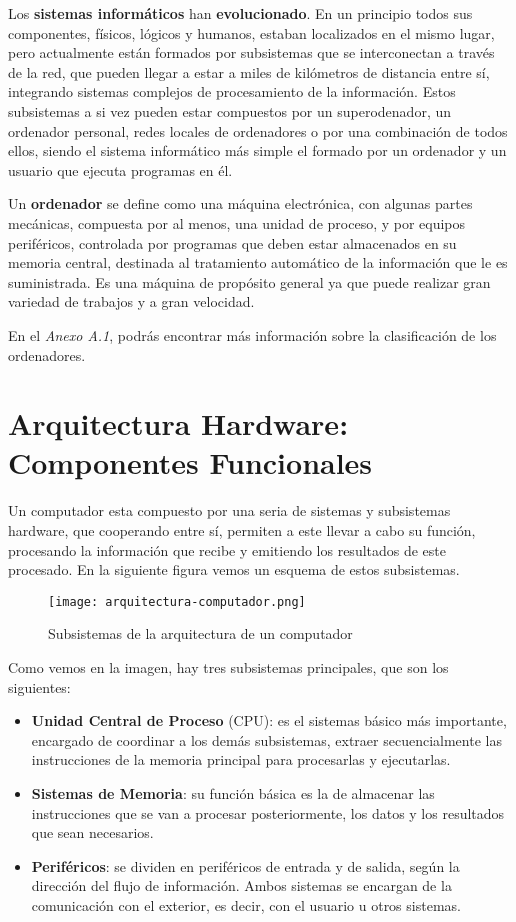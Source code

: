 Los \textbf{sistemas informáticos} han \textbf{evolucionado}. En un principio todos sus componentes, físicos, lógicos y humanos, estaban localizados en el mismo lugar, pero actualmente están formados por subsistemas que se interconectan a través de la red, que pueden llegar a estar a miles de kilómetros de distancia entre sí, integrando sistemas complejos de procesamiento de la información. Estos subsistemas a si vez pueden estar compuestos por un superodenador, un ordenador personal, redes locales de ordenadores o por una combinación de todos ellos, siendo el sistema informático más simple el formado por un ordenador y un usuario que ejecuta programas en él.

Un \textbf{ordenador} se define como una máquina electrónica, con algunas partes mecánicas, compuesta por al menos, una unidad de proceso, y por equipos periféricos, controlada por programas que deben estar almacenados en su memoria central, destinada al tratamiento automático de la información que le es suministrada. Es una máquina de propósito general ya que puede realizar gran variedad de trabajos y a gran velocidad.

En el \textit{Anexo A.1}, podrás encontrar más información sobre la clasificación de los ordenadores.

\section{Arquitectura Hardware: Componentes Funcionales}
Un computador esta compuesto por una seria de sistemas y subsistemas hardware, que cooperando entre sí, permiten a este llevar a cabo su función, procesando la información que recibe y emitiendo los resultados de este procesado.  En la siguiente figura vemos un esquema de estos subsistemas.

\begin{figure}[ht]
    \centering
    \texttt{[image: arquitectura-computador.png]}
    \caption{Subsistemas de la arquitectura de un computador}
\end{figure}


Como vemos en la imagen, hay tres subsistemas principales, que son los siguientes:

\begin{itemize}
    \item \textbf{Unidad Central de Proceso} (CPU): es el sistemas básico más importante, encargado de coordinar a los demás subsistemas, extraer secuencialmente las instrucciones de la memoria principal para procesarlas y ejecutarlas.
    \item \textbf{Sistemas de Memoria}: su función básica es la de almacenar las instrucciones que se van a procesar posteriormente, los datos y los resultados que sean necesarios.
    \item \textbf{Periféricos}: se dividen en periféricos de entrada y de salida, según la dirección del flujo de información. Ambos sistemas se encargan de la comunicación con el exterior, es decir, con el usuario u otros sistemas.
\end{itemize}

